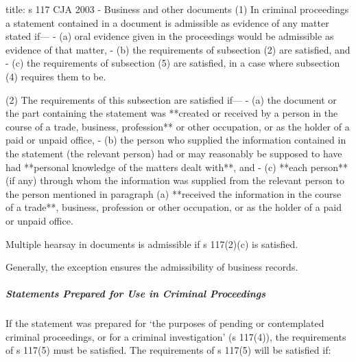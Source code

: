 \documentclass[
]{article}
\newenvironment{Shaded}{}{}
\newcommand{\NormalTok}[1]{#1}
\begin{document}
\begin{Shaded}
\begin{Highlighting}[]
\NormalTok{title: s 117 CJA 2003 {-} Business and other documents}
\NormalTok{(1) In criminal proceedings a statement contained in a document is admissible as evidence of any matter stated if—}
\NormalTok{{-} (a) oral evidence given in the proceedings would be admissible as evidence of that matter,}
\NormalTok{{-} (b) the requirements of subsection (2) are satisfied, and}
\NormalTok{{-} (c) the requirements of subsection (5) are satisfied, in a case where subsection (4) requires them to be.}

\NormalTok{(2) The requirements of this subsection are satisfied if—}
\NormalTok{{-} (a) the document or the part containing the statement was **created or received by a person in the course of a trade, business, profession** or other occupation, or as the holder of a paid or unpaid office,}
\NormalTok{{-} (b) the person who supplied the information contained in the statement (the relevant person) had or may reasonably be supposed to have had **personal knowledge of the matters dealt with**, and}
\NormalTok{{-} (c) **each person** (if any) through whom the information was supplied from the relevant person to the person mentioned in paragraph (a) **received the information in the course of a trade**, business, profession or other occupation, or as the holder of a paid or unpaid office.}
\end{Highlighting}
\end{Shaded}

\begin{Shaded}
\begin{Highlighting}[]
\NormalTok{Multiple hearsay in documents is admissible if s 117(2)(c) is satisfied. }
\end{Highlighting}
\end{Shaded}

Generally, the exception ensures the admissibility of business records.

\hypertarget{statements-prepared-for-use-in-criminal-proceedings}{%
\subparagraph{Statements Prepared for Use in Criminal
Proceedings}\label{statements-prepared-for-use-in-criminal-proceedings}}

If the statement was prepared for `the purposes of pending or
contemplated criminal proceedings, or for a criminal investigation' (s
117(4)), the requirements of s 117(5) must be satisfied. The
requirements of s 117(5) will be satisfied if:
\end{document}
